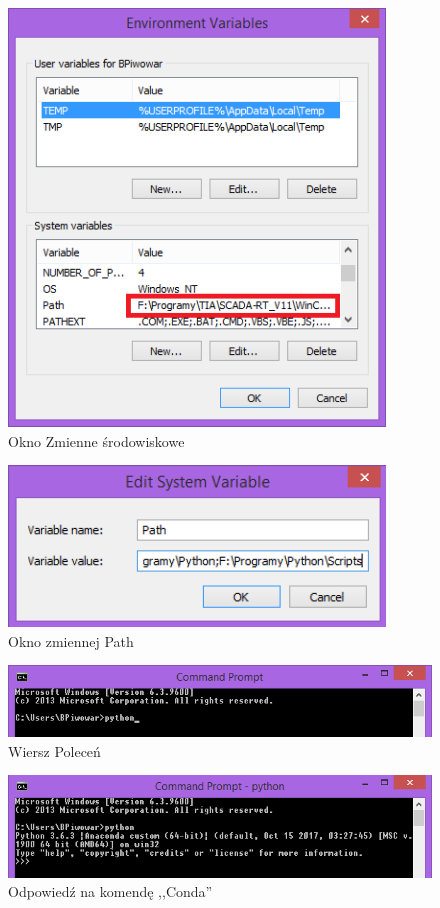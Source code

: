 \begin{figure}[h]
\centering
\includegraphics[width=10cm]{Zdjecia/5/anaconda5}
\caption{Okno Zmienne środowiskowe}
\label{fig:anaconda5}
\end{figure}

\begin{figure}[h]
\centering
\includegraphics[width=10cm]{Zdjecia/5/python6}
\caption{Okno zmiennej Path}
\label{fig:python6}
\end{figure}


\begin{figure}[h]
\centering
\includegraphics[width=14cm]{Zdjecia/5/python7}
\caption{Wiersz Poleceń}
\label{fig:python7}
\end{figure}

\begin{figure}[h]
\centering
\includegraphics[width=14cm]{Zdjecia/5/python8}
\caption{Odpowiedź na komendę ,,Conda''}
\label{fig:python8}
\end{figure}

